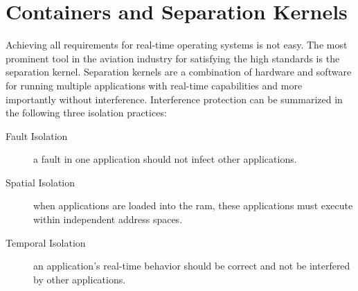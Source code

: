 \documentclass[titlepage]{report}
\begin{document}
\section{Containers and Separation Kernels}
Achieving all requirements for real-time operating systems is not easy. The most prominent tool in the aviation industry for satisfying the high standards is the separation kernel. Separation kernels
are a combination of hardware and software for running multiple applications with real-time capabilities and more importantly without interference\cite{crespo2014mixed}.
Interference protection can be summarized in the following three isolation practices\cite{bredereke2017survey}:

\begin{description}
  \item[Fault Isolation] a fault in one application should not infect other applications.
  \item[Spatial Isolation] when applications are loaded into the \gls{ram}, these applications must execute within independent address spaces.
  \item[Temporal Isolation] an application's real-time behavior should be correct and not be interfered by other applications.
\end{description}
\end{document}
